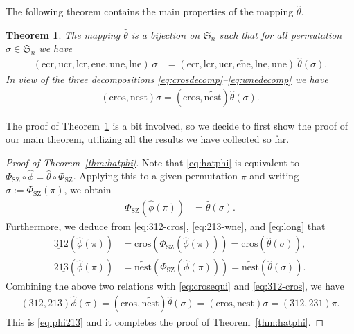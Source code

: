 \documentclass[12pt,reqno]{amsart}
\numberwithin{equation}{section}
\theoremstyle{plain}
\newtheorem{theorem}{Theorem}[section]
\theoremstyle{definition}
\def\Sym{\mathfrak{S}}
\def\SZ{\mathrm{SZ}}
\def\rasc{\mathrm{2\underline{13}}}
\def\rdes{\mathrm{2\underline{31}}}
\def\ldes{\mathrm{\underline{31}2}}
\def\nest{\mathrm{nest}}
\def\cros{\mathrm{cros}}
\def\ucr{\mathrm{ucr}}
\def\ecr{\mathrm{ecr}}
\def\lcr{\mathrm{lcr}}
\def\une{\mathrm{une}}
\def\ene{\mathrm{ene}}
\def\lne{\mathrm{lne}}
\def\wene{\widetilde{\mathrm{ene}}}
\def\wne{\widetilde{\mathrm{nest}}}
\begin{document}
The following theorem contains the main
 properties of the mapping $\widehat{\theta}$.
\begin{theorem}\label{thm:sextuple}
The mapping $\hat{\theta}$ is a bijection on $\Sym_n$ such that for all permutation $\sigma\in\Sym_n$ we have
\begin{align}\label{eq:sextuple}
(\ecr,\ucr,\lcr,\ene,\une,\lne)\: \sigma &= (\ecr,\lcr,\ucr,\wene,\lne,\une)\: \widehat{\theta}(\sigma).
\end{align}
In view of the three decompositions \eqref{eq:crosdecomp}--\eqref{eq:wnedecomp} we have
\begin{align}\label{eq:crosequi}
(\cros, \nest)\sigma=(\cros, \wne)\hat{\theta}(\sigma).


\end{align}
\end{theorem}
The proof of Theorem~\ref{thm:sextuple} is a bit involved, so we decide to first show the proof of our main theorem, utilizing all the results we have collected so far.

\begin{proof}[Proof of Theorem~\ref{thm:hatphi}]
Note that \eqref{eq:hatphi} is equivalent to $\Phi_{\SZ}\circ\widehat{\phi}=\hat{\theta}\circ\Phi_{\SZ}$.
Applying this to a given permutation $\pi$ and writing $\sigma:=\Phi_{\SZ}(\pi)$, we obtain
\begin{align}\label{eq:long}
\Phi_{\SZ}(\widehat{\phi}(\pi)) &= \widehat{\theta}(\sigma).
\end{align}
Furthermore, we deduce from \eqref{eq:312-cros}, \eqref{eq:213-wne}, and \eqref{eq:long} that
\begin{align*}

\ldes(\widehat{\phi}(\pi)) &=\cros(\Phi_{\SZ}(\widehat{\phi}(\pi)))=\cros(\widehat{\theta}(\sigma)),\\
\rasc(\widehat{\phi}(\pi)) &=\wne(\Phi_{\SZ}(\widehat{\phi}(\pi)))=\wne(\widehat{\theta}(\sigma)).
\end{align*}
Combining the above two relations with
\eqref{eq:crosequi} and \eqref{eq:312-cros},  we have
\begin{align*}
(\ldes, \rasc)\widehat{\phi}(\pi)
=(\cros, \widetilde{\nest})\widehat{\theta}(\sigma)
=(\cros, \nest)\sigma
=(\ldes, \rdes)\pi.
\end{align*}
This is \eqref{eq:phi213} and it completes the proof of Theorem~\ref{thm:hatphi}.
\end{proof}
\end{document}
